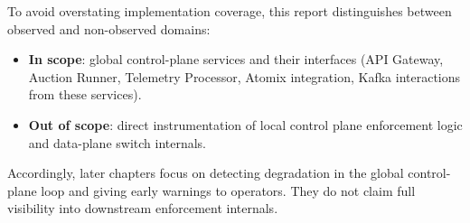 To avoid overstating implementation coverage, this report distinguishes between observed and non-observed domains:

\begin{itemize}
    \item \textbf{In scope}: global control-plane services and their interfaces (API Gateway, Auction Runner, Telemetry Processor, Atomix integration, Kafka interactions from these services).
    \item \textbf{Out of scope}: direct instrumentation of local control plane enforcement logic and data-plane switch internals.
\end{itemize}

Accordingly, later chapters focus on detecting degradation in the global control-plane loop and giving early warnings to operators. They do not claim full visibility into downstream enforcement internals.
